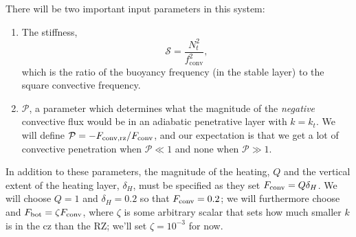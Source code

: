 \documentclass[12pt,preprint]{article}
\begin{document}
There will be two important input parameters in this system:
\begin{enumerate}
\item The stiffness, 
\begin{equation}
\mathcal{S} = \frac{N_{t}^2}{f_{\mathrm{conv}}^2},
\end{equation}
which is the ratio of the buoyancy frequency (in the stable layer) to the square convective frequency.
\item $\mathcal{P}$, a parameter which determines what the magnitude of the \emph{negative} convective flux would be in an adiabatic penetrative layer with $k = k_t$.
We will define $\mathcal{P} = -F_{\rm{conv, rz}}/F_{\rm{conv}}$, and our expectation is that we get a lot of convective penetration when $\mathcal{P} \ll 1$ and none when $\mathcal{P} \gg 1$.
\end{enumerate}
In addition to these parameters, the magnitude of the heating, $Q$ and the vertical extent of the heating layer, $\delta_H$, must be specified as they set $F_{\rm{conv}} = Q \delta_H$.
We will choose $Q = 1$ and $\delta_H = 0.2$ so that $F_{\rm{conv}} = 0.2$; we will furthermore choose and $F_{\rm{bot}} = \zeta F_{\rm{conv}}$, where $\zeta$ is some arbitrary scalar that sets how much smaller $k$ is in the cz than the RZ; we'll set $\zeta = 10^{-3}$ for now.
\end{document}

